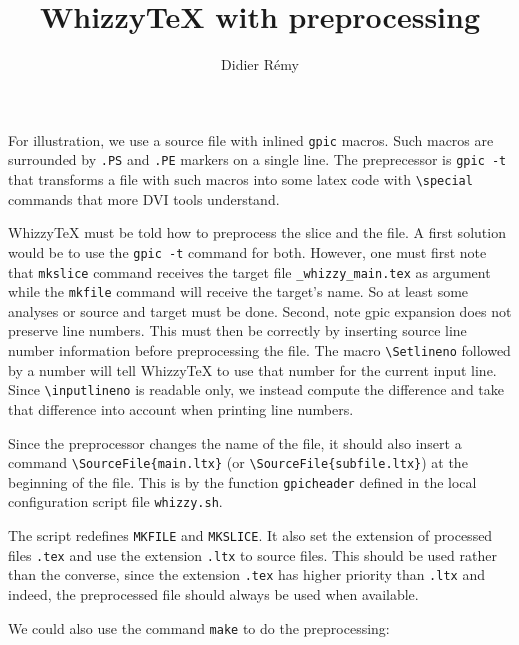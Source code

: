 \documentclass{article}
\title {WhizzyTeX with preprocessing}
\author {Didier R{\'e}my}
\let \lst \verb
\begin{document}
\maketitle

For illustration, we use a source file with inlined {\tt gpic} macros.
Such macros are surrounded by \lst".PS" and \lst".PE" markers on a single
line. The preprecessor is \lst"gpic -t" that transforms a file with such
macros into some latex code with \lst"\special" commands that more
DVI tools understand. 

WhizzyTeX must be told how to preprocess the slice and the file. 
A first solution would be to use the \lst"gpic -t" command for both.
However, one must first note that \lst"mkslice" command receives the target
file \lst"_whizzy_main.tex" as argument while the \lst"mkfile" command will
receive the target's name. So at least some analyses or source and target
must be done. Second, note gpic expansion does not preserve line numbers. 
This must then be correctly by inserting source line number information
before preprocessing the file. The macro \lst"\Setlineno" followed by a
number will tell WhizzyTeX to use that number for the current input line.
Since \lst"\inputlineno" is readable only, we instead compute the difference
and take that difference into account when printing line numbers. 

Since the preprocessor changes the name of the file, it should also insert a
command \lst"\SourceFile{main.ltx}" (or \lst"\SourceFile{subfile.ltx}") at
the beginning of the file.  This is by the function \lst"gpicheader" defined
in the local configuration script file \lst"whizzy.sh".

The script redefines \texttt{MKFILE} and \texttt{MKSLICE}. 
It also set the extension of processed files \texttt{.tex} 
and use the extension \texttt{.ltx} to source files. This should be used
rather than the converse, since the extension \texttt{.tex} has higher
priority than \texttt{.ltx} and indeed, the preprocessed file should always
be used when available.

We could also use the command \lst"make" to do the preprocessing: 
\end{document}
